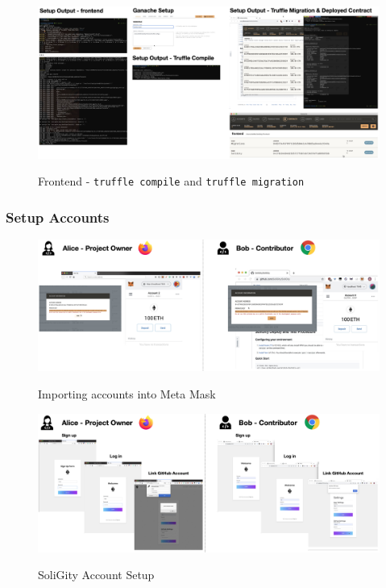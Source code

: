 \documentclass[12pt]{article}
\renewcommand{\_}{\kern-1.5pt\textunderscore\kern-1.5pt}
\begin{document}
\begin{figure}[H]
	\centering
	\includegraphics[width=16.5cm]{graphs/47. setup_2.png}\\
	\caption{Frontend - \texttt{truffle compile} and \texttt{truffle migration}}
	\label{fig:setup4}
\end{figure}


\subsubsection{Setup Accounts}

\begin{figure}[H]
	\centering
	\includegraphics[width=16.5cm]{graphs/48. setup_3.png}\\
	\caption{Importing accounts into Meta Mask}
	\label{fig:setup5}
\end{figure}


\begin{figure}[H]
	\centering
	\includegraphics[width=16.5cm]{graphs/49. setup_4.png}\\
	\caption{SoliGity Account Setup}
	\label{fig:setup6}
\end{figure}
\end{document}
